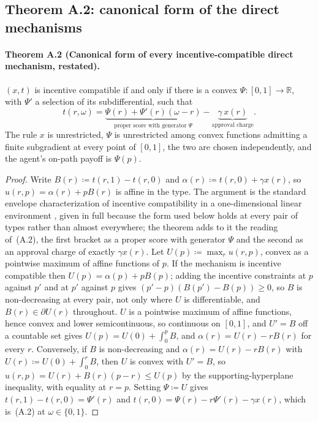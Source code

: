 \documentclass[acmsmall,nonacm,screen]{acmart}
\theoremstyle{acmplain}%
\theoremstyle{acmdefinition}%
\newcommand{\R}{\mathbb{R}}
\numberwithin{equation}{section}
\begin{document}
\begin{appendix}
\subsection{Theorem A.2: canonical form of the direct mechanisms}

\paragraph*{Theorem A.2 (Canonical form of every incentive-compatible direct mechanism, restated).}
$(x,t)$ is incentive compatible if and only if there is a convex $\Psi:[0,1]\to\R$, with $\Psi'$ a selection of its subdifferential, such that
\begin{equation*}
t(r,\omega)=\underbrace{\Psi(r)+\Psi'(r)(\omega-r)}_{\text{proper score with generator }\Psi}-\underbrace{\gamma\,x(r)}_{\text{approval charge}} .
\end{equation*}
The rule $x$ is unrestricted, $\Psi$ is unrestricted among convex functions admitting a finite subgradient at every point of $[0,1]$, the two are chosen independently, and the agent's on-path payoff is $\Psi(p)$.

\begin{proof}
Write $B(r)\coloneqq t(r,1)-t(r,0)$ and $\alpha(r)\coloneqq t(r,0)+\gamma x(r)$, so $u(r,p)=\alpha(r)+pB(r)$ is affine in the type. The argument is the standard envelope characterization of incentive compatibility in a one-dimensional linear environment \citep{myerson1981optimal,rochet1987necessary,vohra2011mechanism}, given in full because the form used below holds at every pair of types rather than almost everywhere; the theorem adds to it the reading of~(A.2), the first bracket as a proper score with generator $\Psi$ and the second as an approval charge of exactly $\gamma x(r)$. Let $U(p)\coloneqq\max_ru(r,p)$, convex as a pointwise maximum of affine functions of $p$. If the mechanism is incentive compatible then $U(p)=\alpha(p)+pB(p)$; adding the incentive constraints at $p$ against $p'$ and at $p'$ against $p$ gives $(p'-p)(B(p')-B(p))\geq0$, so $B$ is non-decreasing at every pair, not only where $U$ is differentiable, and $B(r)\in\partial U(r)$ throughout. $U$ is a pointwise maximum of affine functions, hence convex and lower semicontinuous, so continuous on $[0,1]$, and $U'=B$ off a countable set gives $U(p)=U(0)+\int_0^pB$, and $\alpha(r)=U(r)-rB(r)$ for every $r$. Conversely, if $B$ is non-decreasing and $\alpha(r)=U(r)-rB(r)$ with $U(r)\coloneqq U(0)+\int_0^rB$, then $U$ is convex with $U'=B$, so $u(r,p)=U(r)+B(r)(p-r)\leq U(p)$ by the supporting-hyperplane inequality, with equality at $r=p$. Setting $\Psi\coloneqq U$ gives $t(r,1)-t(r,0)=\Psi'(r)$ and $t(r,0)=\Psi(r)-r\Psi'(r)-\gamma x(r)$, which is~(A.2) at $\omega\in\{0,1\}$.
\end{proof}



\end{appendix}
\end{document}
